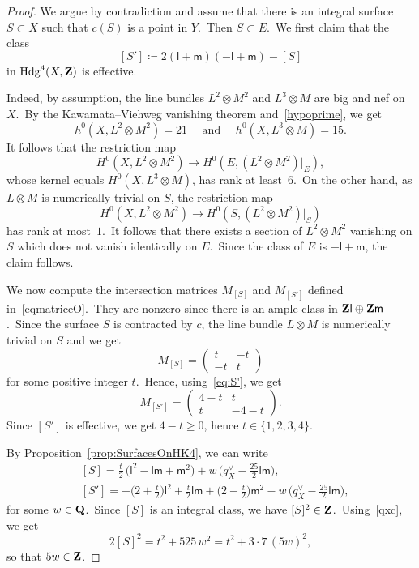 \documentclass[12pt]{amsart}
\def\Z{{\bf Z}}
\def\Q{{\bf Q}}
\DeclareMathOperator{\Hdg}{Hdg}
\def\op{\oplus}
\theoremstyle{remark}
\def\lll{\ensuremath{\mathsf l}}
\def\mm{\ensuremath{\mathsf m}}
\begin{document}
\begin{proof}
We argue by contradiction and assume that there is an integral surface $S\subset X$ such that $c(S)$ is a point in $Y$.\ Then $S\subset E$.\ We first claim that the class
\begin{equation}\label{eq:S'}
[S'] \coloneqq 2(\lll+\mm)(-\lll+\mm) - [S]
\end{equation}
in ${\Hdg}^4(X,\Z)$ is effective.

Indeed, by assumption, the line bundles $L^2\otimes M^2$ and $L^3\otimes M$ are big and nef on $X$.\ By the Kawamata--Viehweg vanishing theorem and~\eqref{hypoprime}, we get
\[
h^0(X, L^2\otimes M^2)=21\quad\text{ and }\quad h^0(X, L^3\otimes M)=15.
\]
It follows that the restriction map
\[
H^0(X,L^2\otimes M^2)\rightarrow H^0(E,(L^2\otimes M^2)\vert_E),
\]
whose kernel equals $H^0(X,L^3\otimes M)$, has rank at least~$6$.\
On the other hand, as $L\otimes M$ is numerically trivial on $S$, the restriction map
\[
H^0(X,L^2\otimes M^2)\rightarrow H^0(S,(L^2\otimes M^2)\vert_S)
\]
has rank at most~$1$.\
It follows that  there exists a section of $L^2\otimes M^2$ vanishing on $S$ which does not vanish identically on $E$.\
Since the class of $E$ is $-\lll+\mm$, the claim follows.

We now compute the  intersection matrices $M_{[S]}$ and $M_{[S']}$ defined in~\eqref{eqmatriceO}.\ They are nonzero since there is an ample class  in $\Z\lll\op\Z\mm$.\
Since the surface $S$ is contracted by $c$, the line bundle $L\otimes M$ is numerically trivial on $S$ and we get
\[
M_{[S]}=
\begin{pmatrix}
t & -t \\
-t & t
\end{pmatrix}
\]
for some positive integer $t$.\
Hence, using~\eqref{eq:S'}, we get
\[
M_{[S']}=
\begin{pmatrix}
4-t & t \\
t & -4-t
\end{pmatrix}.
\]
Since $[S']$ is effective, we get $4-t\geq0$, hence $t\in\{1,2,3,4\}$.

By Proposition~\ref{prop:SurfacesOnHK4}, we can write
\begin{equation}\label{eq:Paris20211103}
\begin{split}
    &[S] = \frac t2\, \Big( \lll^2 -\lll\mm + \mm^2 \Big) +   w\,\Big(q_X^\vee - \frac{25}{2} \lll\mm \Big), \\
    &[S'] = -\Big(2+ \frac t2 \Big)\lll^2 + \frac t2 \lll\mm + \Big(2 - \frac t2 \Big)\mm^2 -   w\,\Big(q_X^\vee - \frac{25}{2} \lll\mm \Big),
\end{split}
\end{equation}
for some $w\in\Q$.\
Since $[S]$ is an integral class, we have $[S]^2\in\Z$.\
Using~\eqref{qxc}, we get
\[
2[S]^2 =   t^2 + 525\, w^2=t^2 + 3\cdot  7\, (5w)^2,
\]
so that $5w\in\Z$.


\end{proof}
\end{document}
